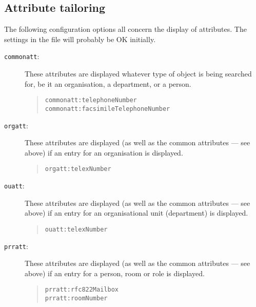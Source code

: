 \subsection{Attribute tailoring}

The following configuration options all concern the display of attributes.
The settings in the  file will probably be OK initially.

\begin{description}

\item [\verb+commonatt+:]  These attributes are displayed whatever type of 
object is being searched for, be it an organisation, a department, or a person.

\begin{quote}\small\begin{verbatim}
commonatt:telephoneNumber
commonatt:facsimileTelephoneNumber
\end{verbatim}\end{quote}

\item [\verb+orgatt+:]  These attributes are displayed (as well as the common
attributes --- see above) if an entry for an organisation is displayed.

\begin{quote}\small\begin{verbatim}
orgatt:telexNumber
\end{verbatim}\end{quote}

\item [\verb+ouatt+:]  These attributes are displayed (as well as the common
attributes --- see above) if an entry for an organisational unit (department)
is displayed.

\begin{quote}\small\begin{verbatim}
ouatt:telexNumber
\end{verbatim}\end{quote}

\item [\verb+prratt+:]  These attributes are displayed (as well as the common
attributes --- see above) if an entry for a person, room or role is displayed.

\begin{quote}\small\begin{verbatim}
prratt:rfc822Mailbox
prratt:roomNumber
\end{verbatim}\end{quote}


\end{description}
